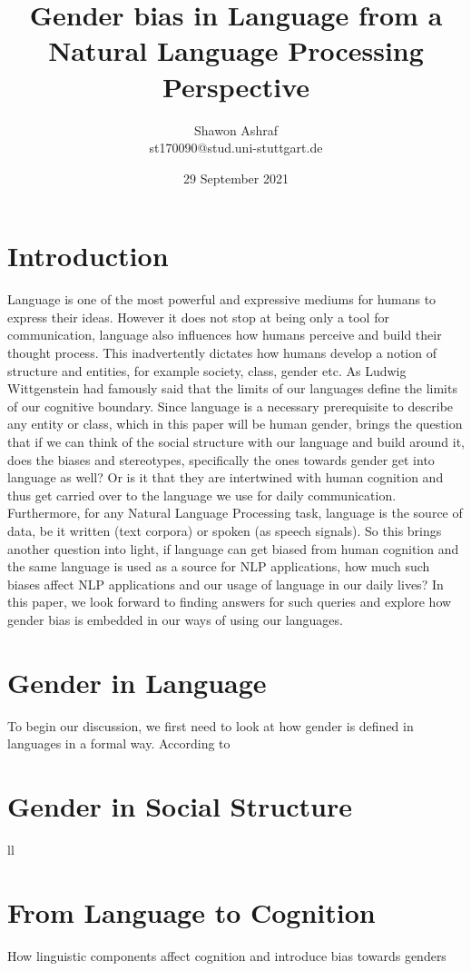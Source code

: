 \documentclass{article}
\title{Gender bias in Language from a Natural Language Processing Perspective}
\author{Shawon Ashraf \\ st170090@stud.uni-stuttgart.de}
\date{29 September 2021}
\begin{document}
\maketitle

\section{Introduction}
Language is one of the most powerful and expressive mediums for humans to express their ideas. However it does not stop at being only a tool for communication, language also influences how humans perceive and build their thought process. This inadvertently dictates how humans develop a notion of structure and entities, for example society, class, gender etc. As Ludwig Wittgenstein had famously said that the limits of our languages define the limits of our cognitive boundary. Since language is a necessary prerequisite to describe any entity or class, which in this paper will be human gender, brings the question that if we can think of the social structure with our language and build around it, does the biases and stereotypes, specifically the ones towards gender get into language as well? Or is it that they are intertwined with human cognition and thus get carried over to the language we use for daily communication. Furthermore, for any Natural Language Processing task, language is the source of data, be it written (text corpora) or spoken (as speech signals). So this brings another question into light, if language can get biased from human cognition and the same language is used as a source for NLP applications, how much such biases affect NLP applications and our usage of language in our daily lives? In this paper, we look forward to finding answers for such queries and explore how gender bias is embedded in our ways of using our languages.

\section{Gender in Language}
To begin our discussion, we first need to look at how gender is defined in languages in a formal way. According to \cite{larson2017gender}

\section{Gender in Social Structure}
ll

\section{From Language to Cognition}
How linguistic components affect cognition and introduce bias towards genders
\end{document}

